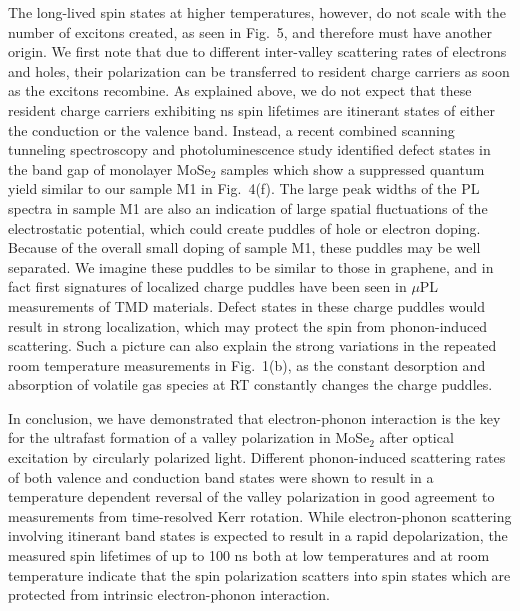\documentclass[prb,aps,superscriptaddress,reprint]{revtex4-1}
\begin{document}
The long-lived spin states at higher temperatures, however, do not scale with the number of excitons created, as seen in Fig.~5, and therefore must have another origin. We first note that due to different inter-valley scattering rates of electrons and holes, their polarization can be transferred to resident charge carriers as soon as the excitons recombine.\cite{NatureComm.6.896} 
As explained above, we do not expect that these resident charge carriers exhibiting ns spin lifetimes are itinerant states of either the conduction or the valence band. Instead, a recent combined scanning tunneling spectroscopy and photoluminescence study identified defect states in the band gap of monolayer MoSe$_2$ samples which show a suppressed quantum yield similar to our sample M1 in Fig.~4(f).\cite{arXiv180500127} The large peak widths of the PL spectra in sample M1 are also an indication of large spatial fluctuations of the electrostatic potential, which could create puddles of hole or electron doping. Because of the overall small doping of sample M1, these puddles may be well separated. We imagine these puddles to be similar to those in graphene,\cite{NaturePhysics.4.144} and in fact first signatures of localized charge puddles have been seen in $\mu$PL measurements of TMD materials.\cite{ACSNano.11.2115} Defect states in these charge puddles would result in strong localization, which may protect the spin from phonon-induced scattering. Such a picture can also explain the strong variations in the repeated room temperature measurements in Fig.~1(b), as the constant desorption and absorption of volatile gas species at RT constantly changes the charge puddles.

In conclusion, we have demonstrated that electron-phonon interaction is the key for the ultrafast formation of a valley polarization in MoSe$_2$ after optical excitation by circularly polarized light. Different phonon-induced scattering rates of both valence and conduction band states were shown to result in a temperature dependent reversal of the valley polarization in good agreement to measurements from time-resolved Kerr rotation. While electron-phonon scattering involving itinerant band states is expected to result in a rapid depolarization, the measured spin lifetimes of up to 100 ns both at low temperatures and at room temperature indicate that the spin polarization scatters into spin states which are protected from intrinsic electron-phonon interaction. 
\end{document}
